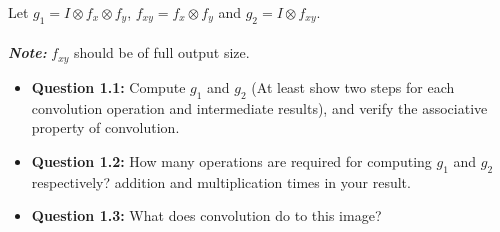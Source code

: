 Let \( g_{1} = I \otimes f_{x} \otimes f_{y}\), \( f_{xy} = f_{x} \otimes f_{y}\) and \( g_{2} = I \otimes f_{xy}\).\\
\\ \emph{\textbf{Note:}} \( f_{xy}\) should be of full output size.
\begin{itemize}
\item \textbf{Question 1.1:} Compute \( g_{1}\) and \( g_{2}\) (At least show two steps for each convolution operation and intermediate results), and verify the associative property of convolution.

\item \textbf{Question 1.2:} How many operations are required for computing \( g_{1}\) and \( g_{2}\) respectively? 
addition and multiplication times in your result.

\item \textbf{Question 1.3:} What does convolution do to this image?
\end{itemize}


